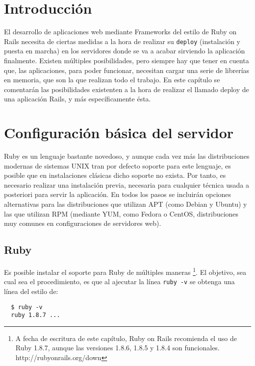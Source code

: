 \section{Introducción} %
\label{sec:introducccion}

El desarrollo de aplicaciones web mediante Frameworks del estilo de Ruby on Rails necesita de ciertas medidas a la hora de realizar su \texttt{deploy} (instalación y puesta en marcha) en los servidores donde se va a acabar sirviendo la aplicación finalmente. Existen múltiples posibilidades, pero siempre hay que tener en cuenta que, las aplicaciones, para poder funcionar, necesitan cargar una serie de librerías en memoria, que son la que realizan todo el trabajo. En este capítulo se comentarán las posibilidades existenten a la hora de realizar el llamado deploy de una aplicación Rails, y más específicamente ésta.

\section{Configuración básica del servidor} %
\label{sub:configuracion_basica_del_servidor}

Ruby es un lenguaje bastante novedoso, y aunque cada vez más las distribuciones modernas de sistemas UNIX tran por defecto soporte para este lenguaje, es posible que en instalaciones clásicas dicho soporte no exista. Por tanto, es necesario realizar una instalación previa, necesaria para cualquier técnica usada a posteriori para servir la aplicación. En todos los pasos se incluirán opciones alternativas para las distribuciones que utilizan APT (como Debian y Ubuntu) y las que utilizan RPM (mediante YUM, como Fedora o CentOS, distribuciones muy comunes en configuraciones de servidores web).

\subsection{Ruby} %
\label{ssub:ruby}

Es posible instalar el soporte para Ruby de múltiples maneras \footnote{A fecha de escritura de este capítulo, Ruby on Rails recomienda el uso de Ruby 1.8.7, aunque las versiones 1.8.6, 1.8.5 y 1.8.4 son funcionales. http://rubyonrails.org/down}. El objetivo, sea cual sea el procedimiento, es que al ajecutar la línea \texttt{ruby -v} se obtenga una línea del estilo de:

\begin{verbatim}
  $ ruby -v
  ruby 1.8.7 ...
\end{verbatim}

